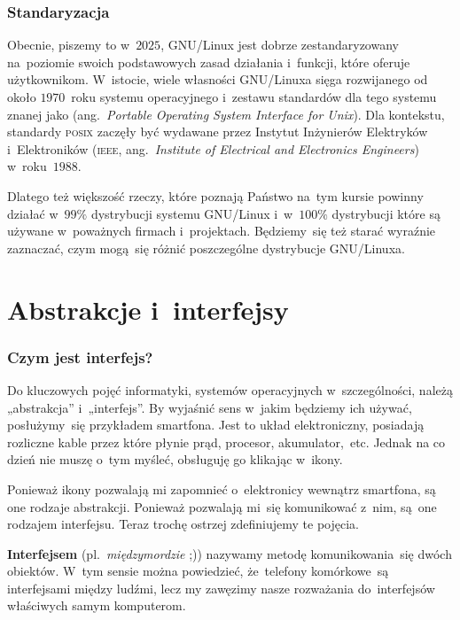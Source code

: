 \documentclass[10pt,t]{beamer}
\begin{document}
\begin{frame}
  \frametitle{Standaryzacja}


  Obecnie, piszemy to w~$2025$, GNU/Linux jest dobrze zestandaryzowany
  na~poziomie swoich podstawowych zasad działania i~funkcji, które oferuje
  użytkownikom. W~istocie, wiele własności GNU/Linuxa sięga rozwijanego od
  około $1970$~roku systemu operacyjnego
   i~zestawu
  standardów dla tego systemu znanej jako
  (ang.~\textit{Portable Operating System Interface for Unix}). Dla
  kontekstu, standardy \textsc{posix} zaczęły być wydawane przez Instytut
  Inżynierów Elektryków i~Elektroników (\textsc{ieee},
  ang.~\textit{Institute of Electrical and Electronics Engineers})
  w~roku~$1988$.

  Dlatego też większość rzeczy, które poznają Państwo na~tym kursie powinny
  działać w~$99\%$ dystrybucji systemu GNU/Linux i~w~$100\%$ dystrybucji
  które są używane w~poważnych firmach i~projektach. Będziemy~się też
  starać wyraźnie zaznaczać, czym mogą~się różnić poszczególne dystrybucje
  GNU/Linuxa.

\end{frame}





\section{Abstrakcje i~interfejsy}


\begin{frame}
  \frametitle{Czym jest interfejs?}


  Do kluczowych pojęć informatyki, systemów operacyjnych w~szczególności,
  należą „abstrakcja” i~„interfejs”. By wyjaśnić sens w~jakim będziemy ich
  używać, posłużymy~się przykładem smartfona. Jest to układ elektroniczny,
  posiadają rozliczne kable przez które płynie prąd, procesor,
  akumulator,~etc. Jednak na co dzień nie muszę o~tym myśleć, obsługuję go
  klikając w~ikony.

  Ponieważ ikony pozwalają mi zapomnieć o~elektronicy wewnątrz smartfona,
  są one rodzaje abstrakcji. Ponieważ pozwalają mi~się komunikować z~nim,
  są~one rodzajem interfejsu. Teraz trochę ostrzej zdefiniujemy te pojęcia.

  \textbf{Interfejsem} (pl.~\textit{międzymordzie} ;)) nazywamy metodę
  komunikowania~się dwóch obiektów. W~tym sensie można powiedzieć,
  że~telefony komórkowe~są interfejsami między ludźmi, lecz my zawęzimy
  nasze rozważania do~interfejsów właściwych samym komputerom.

\end{frame}
\end{document}
